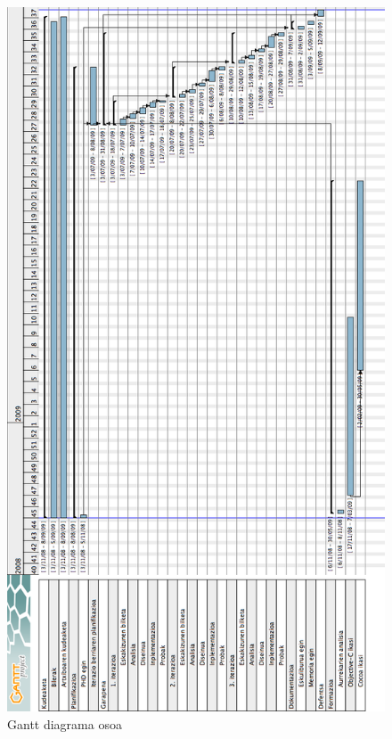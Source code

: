\begin{figure}[htp]
\begin{center}
\includegraphics[scale=0.46]{Pictures/Chapter3/Gantt-osoa.png}
\caption{Gantt diagrama osoa}
\label{gantt.osoa}
\end{center}
\end{figure}

